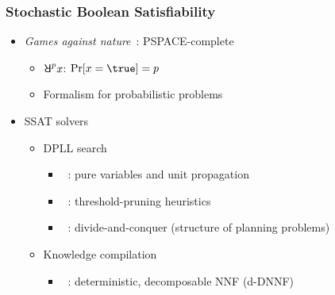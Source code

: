\begin{frame}
      \frametitle{Stochastic Boolean Satisfiability}
      \begin{itemize}
            \item \textit{Games against nature}~\cite{Papadimitriou1985}: PSPACE-complete~\cite{Stockmeyer1973}
                  \pause
                  \begin{itemize}
                        \item $\random{p}x$: $\spb{x=\true}=p$
                              \pause
                        \item Formalism for probabilistic problems~\cite{SATHandbook-SSAT}
                              \pause
                  \end{itemize}
            \item SSAT solvers
                  \pause
                  \begin{itemize}
                        \item DPLL search~\cite{Davis1962}
                              \pause
                              \begin{itemize}
                                    \item \maxplan~\cite{Majercik1998}: pure variables and unit propagation
                                          \pause
                                    \item \zander~\cite{Majercik2003}: threshold-pruning heuristics
                                          \pause
                                    \item \dcssat~\cite{Majercik2005}: divide-and-conquer (structure of planning problems)
                                          \pause
                              \end{itemize}
                        \item Knowledge compilation~\cite{Darwiche2002KnowledgeCompilation}
                              \pause
                              \begin{itemize}
                                    \item \complan~\cite{Huang2006}: deterministic, decomposable NNF (d-DNNF)~\cite{Darwiche2001,Darwiche2002dDNNF}
                              \end{itemize}
                  \end{itemize}
      \end{itemize}
\end{frame}